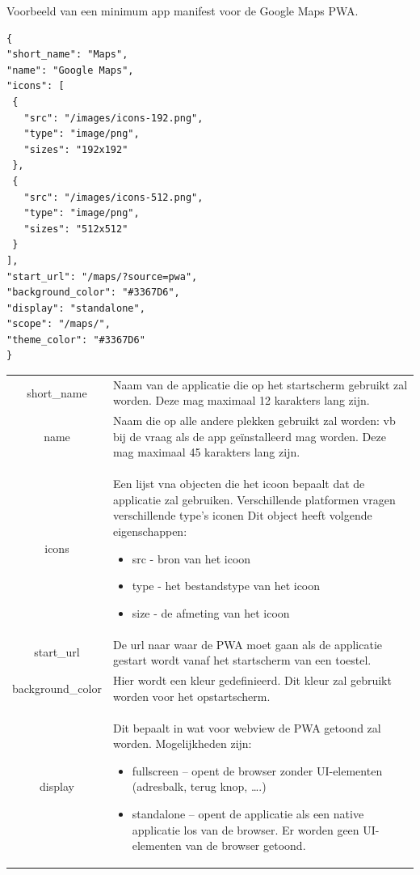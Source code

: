 	Voorbeeld van een minimum app manifest voor de Google Maps PWA.
	
\begin{lstlisting}
{
"short_name": "Maps",
"name": "Google Maps",
"icons": [
 {
   "src": "/images/icons-192.png",
   "type": "image/png",
   "sizes": "192x192"
 },
 {
   "src": "/images/icons-512.png",
   "type": "image/png",
   "sizes": "512x512"
 }
],
"start_url": "/maps/?source=pwa",
"background_color": "#3367D6",
"display": "standalone",
"scope": "/maps/",
"theme_color": "#3367D6"
}
\end{lstlisting}
	
	
		\begin{table}[H]
			\centering
			\begin{tabular}{cp{12cm}}
	     		short\_name & Naam van de applicatie die op het startscherm gebruikt zal worden. Deze mag maximaal 12 karakters lang zijn. \\
	     		name & Naam die op alle andere plekken gebruikt zal worden: vb bij de vraag als de app geïnstalleerd mag worden. Deze mag maximaal 45 karakters lang zijn. \\
	     		icons & Een lijst vna objecten die het icoon bepaalt dat de applicatie zal gebruiken.
Verschillende platformen vragen verschillende type's iconen Dit object heeft volgende eigenschappen:
		     		\begin{itemize}
			    		  \item src - bron van het icoon
			    		  \item type - het bestandstype van het icoon
			    		  \item size - de afmeting van het icoon
	     			\end{itemize} \\
	     		start\_url & De url naar waar de PWA moet gaan als de applicatie gestart wordt vanaf het startscherm van een toestel.\\
	     		background\_color & Hier wordt een kleur gedefinieerd. Dit kleur zal gebruikt worden voor het opstartscherm. \\
	     		display & Dit bepaalt in wat voor webview de PWA getoond zal worden. Mogelijkheden zijn:
		     		\begin{itemize}
			     		  \item fullscreen – opent de browser zonder UI-elementen (adresbalk, terug knop, ….)
			     		  \item standalone – opent de applicatie als een native applicatie los van de browser. Er worden geen UI-elementen van de browser getoond.

\end{itemize}
\end{tabular}
\end{table}

